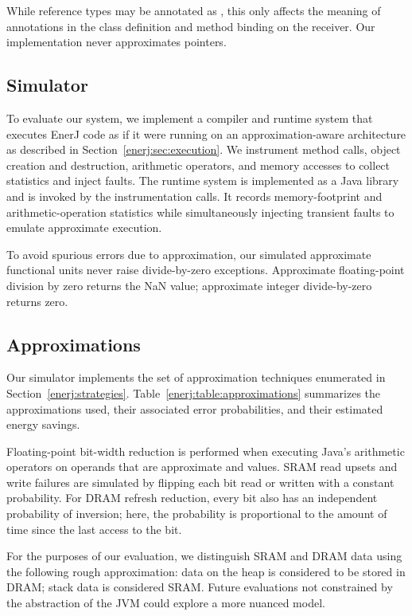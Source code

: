 While reference types may be annotated as , this only affects
the meaning of  annotations in the class definition and
method binding on the receiver. Our implementation never
approximates pointers.


\subsection{Simulator}
To evaluate our system, we implement a compiler and runtime
system that executes EnerJ code as if it were running on an
approximation-aware architecture
as described in Section~\ref{enerj:sec:execution}. We instrument method calls,
object creation and destruction, arithmetic operators, and memory
accesses to collect statistics and inject faults.
The runtime system is implemented as a Java library and is invoked by the
instrumentation calls.
It records memory-footprint and arithmetic-operation statistics
while simultaneously injecting transient faults to emulate approximate
execution.

To avoid spurious errors due to approximation, our simulated
approximate functional units never raise divide-by-zero exceptions. Approximate
floating-point division by zero returns the NaN value;
approximate integer divide-by-zero returns zero.


\subsection{Approximations}
Our simulator implements the set of approximation techniques enumerated in
Section~\ref{enerj:strategies}. Table~\ref{enerj:table:approximations} summarizes the
approximations used, their associated error probabilities, and their
estimated energy savings.

Floating-point bit-width reduction is performed when executing Java's
arithmetic operators on operands that are approximate 
and  values. SRAM read upsets and write failures are
simulated by flipping each bit read or written with a constant
probability. For DRAM refresh reduction, every bit also has an
independent probability of inversion; here, the probability is
proportional to the amount of time since the last access to the bit.

For the purposes of our evaluation, we distinguish SRAM and DRAM data using the
following rough approximation: data on the heap is considered to be stored
in DRAM; stack data is considered SRAM\@. Future evaluations not constrained by
the abstraction of the JVM could explore a more nuanced model.

